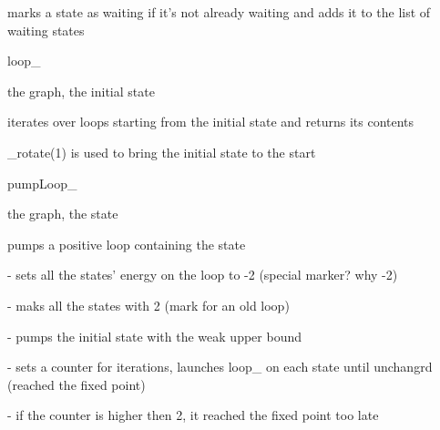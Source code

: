\documentclass[runningheads, envcountsame]{llncs}
\begin{document}
marks a state as waiting if it’s not already waiting and adds it to the list of waiting states



loop_

the graph, the initial state

iterates over loops starting from the initial state and returns its contents

_rotate(1) is used to bring the initial state to the start



pumpLoop_

the graph, the state

pumps a positive loop containing the state

- sets all the states’ energy on the loop to -2 (special marker? why -2)

- maks all the states with 2 (mark for an old loop)

- pumps the initial state with the weak upper bound

- sets a counter for iterations, launches loop_ on each state until unchangrd (reached the fixed point)

- if the counter is higher then 2, it reached the fixed point too late

% 
% 
\end{document}

